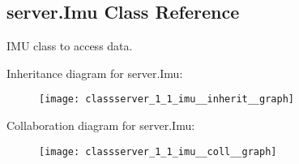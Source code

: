 \hypertarget{classserver_1_1_imu}{\subsection{server.\-Imu Class Reference}
\label{classserver_1_1_imu}
}


I\-M\-U class to access data.  




Inheritance diagram for server.\-Imu\-:
\nopagebreak
\begin{figure}[H]
\begin{center}
\leavevmode
\texttt{[image: classserver\_1\_1\_imu\_\_inherit\_\_graph]}
\end{center}
\end{figure}


Collaboration diagram for server.\-Imu\-:
\nopagebreak
\begin{figure}[H]
\begin{center}
\leavevmode
\texttt{[image: classserver\_1\_1\_imu\_\_coll\_\_graph]}
\end{center}
\end{figure}

